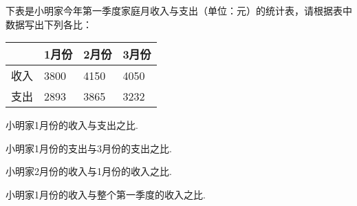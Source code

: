 下表是小明家今年第一季度家庭月收入与支出（单位：元）的统计表，请根据表中数据写出下列各比：

\begin{center}

    \begin{tabular}{|p{2.5cm}<{\centering}|p{2.5cm}<{\centering}|p{2.5cm}<{\centering}|p{2.5cm}<{\centering}|}

         \hline

         &1月份&2月份&3月份 \\

         \hline

        收入&3800&4150&4050 \\

        \hline

        支出&2893&3865&3232 \\

        \hline

    \end{tabular}

\end{center}

\begin{subquestions}

    \subquestion 小明家1月份的收入与支出之比. 

    \subquestion 小明家1月份的支出与3月份的支出之比.   

    \subquestion 小明家2月份的收入与1月份的收入之比.   

    \subquestion 小明家1月份的收入与整个第一季度的收入之比.

\end{subquestions}

  



